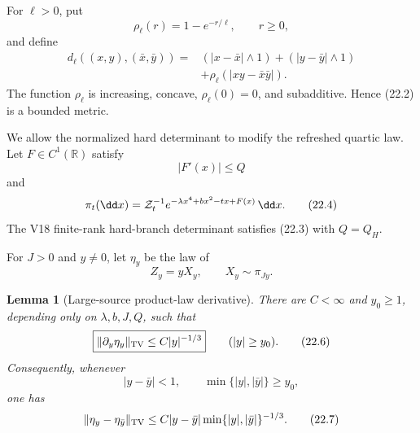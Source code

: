 \documentclass[11pt]{article}
\newtheorem{lemma}[theorem]{Lemma}
\theoremstyle{remark}
\begin{document}
For \(\ell>0\), put
\[
 \rho_\ell(r)=1-e^{-r/\ell},\qquad r\ge0,                   \tag{22.1}
\]
and define
\[
\begin{aligned}
 d_\ell((x,y),(\bar x,\bar y))
 ={}&
 (|x-\bar x|\wedge1)+(|y-\bar y|\wedge1)\\
 &+\rho_\ell(|xy-\bar x\bar y|).                           \tag{22.2}
\end{aligned}
\]
The function \(\rho_\ell\) is increasing, concave,
\(\rho_\ell(0)=0\), and subadditive.  Hence (22.2) is a bounded
metric.

We allow the normalized hard determinant to modify the refreshed
quartic law.  Let \(F\in C^1(\mathbb R)\) satisfy
\[
 |F'(x)|\le Q                                               \tag{22.3}
\]
and
\[
 \pi_t(\dd x)
 =
 {\cal Z}_t^{-1}
 e^{-\lambda x^4+bx^2-tx+F(x)}\,\dd x.                     \tag{22.4}
\]
The V18 finite-rank hard-branch determinant satisfies (22.3) with
\(Q=Q_H\).

For \(J>0\) and \(y\ne0\), let \(\eta_y\) be the law of
\[
 Z_y=yX_y,\qquad X_y\sim\pi_{Jy}.                           \tag{22.5}
\]

\begin{lemma}[Large-source product-law derivative]
\label{lem:v15v22-product-tv}
There are \(C<\infty\) and \(y_0\ge1\), depending only on
\(\lambda,b,J,Q\), such that
\[
 \boxed{
 \|\partial_y\eta_y\|_{\rm TV}
 \le C|y|^{-1/3}}
 \qquad(|y|\ge y_0).                                       \tag{22.6}
\]
Consequently, whenever
\[
 |y-\bar y|<1,\qquad
 \min\{|y|,|\bar y|\}\ge y_0,
\]
one has
\[
 \|\eta_y-\eta_{\bar y}\|_{\rm TV}
 \le
 C|y-\bar y|
 \min\{|y|,|\bar y|\}^{-1/3}.                              \tag{22.7}
\]
\end{lemma}
\end{document}
